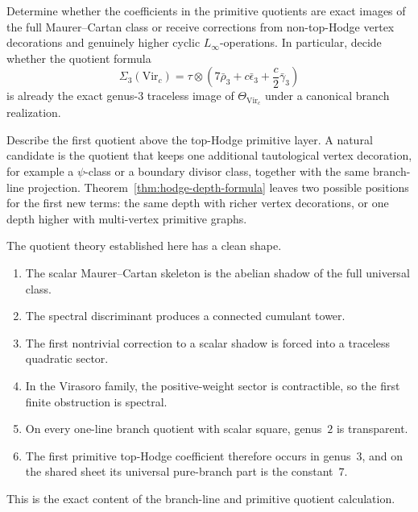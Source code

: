 \begin{problem}
\label{prob:renormalization-primitive-coefficients}
Determine whether the coefficients in the primitive quotients are exact
images of the full Maurer--Cartan class or receive corrections from
non-top-Hodge vertex decorations and genuinely higher cyclic
\(L_\infty\)-operations. In particular, decide whether the quotient
formula
\[
\Sigma_3(\mathrm{Vir}_c)
=
\tau\otimes
\left(
7\bar\rho_3+c\bar\epsilon_3+\frac{c}{2}\bar\gamma_3
\right)
\]
is already the exact genus-\(3\) traceless image of
\(\Theta_{\mathrm{Vir}_c}\) under a canonical branch realization.
\end{problem}

\begin{problem}
\label{prob:beyond-top-hodge}
Describe the first quotient above the top-Hodge primitive layer. A
natural candidate is the quotient that keeps one additional tautological
vertex decoration, for example a \(\psi\)-class or a boundary divisor
class, together with the same branch-line projection. Theorem~\ref{thm:hodge-depth-formula}
leaves two possible positions for the first new terms: the same depth
with richer vertex decorations, or one depth higher with multi-vertex
primitive graphs.
\end{problem}

\begin{remark}
\label{rem:blr-structural-picture}
The quotient theory established here has a clean shape.
\begin{enumerate}[label=\textup{(\roman*)}]
\item The scalar Maurer--Cartan skeleton is the abelian shadow of the
 full universal class.
\item The spectral discriminant produces a connected cumulant tower.
\item The first nontrivial correction to a scalar shadow is forced into a
 traceless quadratic sector.
\item In the Virasoro family, the positive-weight sector is contractible,
 so the first finite obstruction is spectral.
\item On every one-line branch quotient with scalar square, genus~\(2\)
 is transparent.
\item The first primitive top-Hodge coefficient therefore occurs in
 genus~\(3\), and on the shared sheet its universal pure-branch part is
 the constant~\(7\).
\end{enumerate}
This is the exact content of the branch-line and primitive quotient
calculation.
\end{remark}

